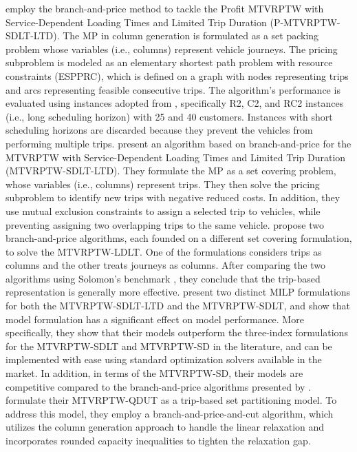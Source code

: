 \documentclass[11pt]{article}
\begin{document}
\cite{azi2010exact} employ the branch-and-price method to tackle the Profit MTVRPTW with Service-Dependent Loading Times and Limited Trip Duration (P-MTVRPTW-SDLT-LTD).  The MP in column generation is formulated as a set packing problem whose variables (i.e., columns) represent vehicle journeys.  The pricing subproblem is modeled as an elementary shortest path problem with resource constraints (ESPPRC), which is defined on a graph with nodes representing trips and arcs representing feasible consecutive trips.  The algorithm's performance is evaluated using instances adopted from \cite{solomon1987algorithms}, specifically R2, C2, and RC2 instances (i.e., long scheduling horizon) with 25 and 40 customers.  Instances with short scheduling horizons are discarded because they prevent the vehicles from performing multiple trips.  \cite{hernandez2014new} present an algorithm based on branch-and-price for the MTVRPTW with Service-Dependent Loading Times and Limited Trip Duration (MTVRPTW-SDLT-LTD).  They formulate the MP as a set covering problem, whose variables (i.e., columns) represent trips.  They then solve the pricing subproblem to identify new trips with negative reduced costs.  In addition, they use mutual exclusion constraints to assign a selected trip to vehicles, while preventing assigning two overlapping trips to the same vehicle. 
 \cite{hernandez2016branch} propose two branch-and-price algorithms, each founded on a different set covering formulation, to solve the MTVRPTW-LDLT.  One of the formulations considers trips as columns and the other treats journeys as columns.  After comparing the two algorithms using Solomon's benchmark \citep{solomon1987algorithms}, they conclude that the trip-based representation is generally more effective.  \cite{neira2020new} present two distinct MILP formulations for both the MTVRPTW-SDLT-LTD and the MTVRPTW-SDLT, and show that model formulation has a significant effect on model performance.  More specifically, they show that their models outperform the three-index formulations for the MTVRPTW-SDLT and MTVRPTW-SD in the literature, and can be implemented with ease using standard optimization solvers available in the market.  In addition, in terms of the MTVRPTW-SD, their models are competitive compared to the branch-and-price algorithms presented by \cite{hernandez2016branch}.  \cite{huang2021multi} formulate their MTVRPTW-QDUT as a trip-based set partitioning model.  To address this model, they employ a branch-and-price-and-cut algorithm, which utilizes the column generation approach to handle the linear relaxation and incorporates rounded capacity inequalities to tighten the relaxation gap.
\newline
\end{document}
